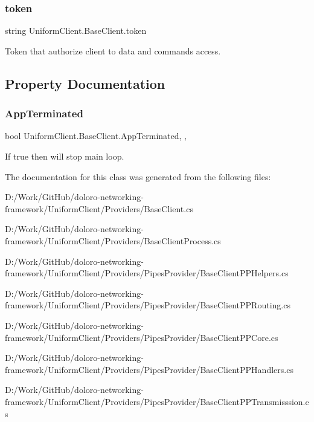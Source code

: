 \subsubsection{\texorpdfstring{token}{token}}
{\footnotesize\ttfamily string Uniform\+Client.\+Base\+Client.\+token\hspace{0.3cm}{\ttfamily [static]}}



Token that authorize client to data and commands access. 



\subsection{Property Documentation}
\mbox{\label{class_uniform_client_1_1_base_client_a10f1c9dbb8d41719754b39344432497f}} 
\subsubsection{\texorpdfstring{App\+Terminated}{AppTerminated}}
{\footnotesize\ttfamily bool Uniform\+Client.\+Base\+Client.\+App\+Terminated\hspace{0.3cm}{\ttfamily [static]}, {\ttfamily [get]}, {\ttfamily [set]}}



If true then will stop main loop. 



The documentation for this class was generated from the following files\+:\begin{DoxyCompactItemize}
\item 
D\+:/\+Work/\+Git\+Hub/doloro-\/networking-\/framework/\+Uniform\+Client/\+Providers/Base\+Client.\+cs\item 
D\+:/\+Work/\+Git\+Hub/doloro-\/networking-\/framework/\+Uniform\+Client/\+Providers/Base\+Client\+Process.\+cs\item 
D\+:/\+Work/\+Git\+Hub/doloro-\/networking-\/framework/\+Uniform\+Client/\+Providers/\+Pipes\+Provider/Base\+Client\+P\+P\+Helpers.\+cs\item 
D\+:/\+Work/\+Git\+Hub/doloro-\/networking-\/framework/\+Uniform\+Client/\+Providers/\+Pipes\+Provider/Base\+Client\+P\+P\+Routing.\+cs\item 
D\+:/\+Work/\+Git\+Hub/doloro-\/networking-\/framework/\+Uniform\+Client/\+Providers/\+Pipes\+Provider/Base\+Client\+P\+P\+Core.\+cs\item 
D\+:/\+Work/\+Git\+Hub/doloro-\/networking-\/framework/\+Uniform\+Client/\+Providers/\+Pipes\+Provider/Base\+Client\+P\+P\+Handlers.\+cs\item 
D\+:/\+Work/\+Git\+Hub/doloro-\/networking-\/framework/\+Uniform\+Client/\+Providers/\+Pipes\+Provider/Base\+Client\+P\+P\+Transmisssion.\+cs\end{DoxyCompactItemize}
